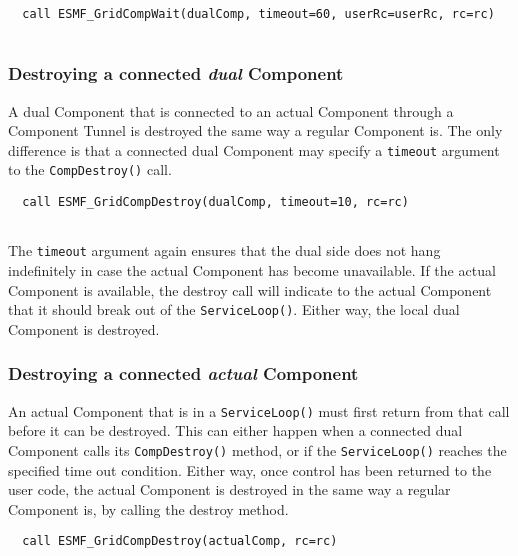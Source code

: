  \begin{verbatim}
  call ESMF_GridCompWait(dualComp, timeout=60, userRc=userRc, rc=rc)
 
\end{verbatim}
 

  \subsubsection{Destroying a connected {\em dual} Component}
   
   \label{sec:CompTunnelDualDestroy}
  
   A dual Component that is connected to an actual Component through a Component
   Tunnel is destroyed the same way a regular Component is. The only
   difference is that a connected dual Component may specify a {\tt timeout}
   argument to the {\tt CompDestroy()} call. 

 \begin{verbatim}
  call ESMF_GridCompDestroy(dualComp, timeout=10, rc=rc)
 
\end{verbatim}
 

   The {\tt timeout} argument again ensures that the dual side does not hang
   indefinitely in case the actual Component has become unavailable. If the
   actual Component is available, the destroy call will indicate to the actual
   Component that it should break out of the {\tt ServiceLoop()}. Either way,
   the local dual Component is destroyed. 

  \subsubsection{Destroying a connected {\em actual} Component}
   
   \label{sec:CompTunnelActualDestroy}
  
   An actual Component that is in a {\tt ServiceLoop()} must first return from 
   that call before it can be destroyed. This can either happen when a connected
   dual Component calls its {\tt CompDestroy()} method, or if the
   {\tt ServiceLoop()} reaches the specified time out condition. Either way,
   once control has been returned to the user code, the actual Component is 
   destroyed in the same way a regular Component is, by calling the destroy
   method. 

 \begin{verbatim}
  call ESMF_GridCompDestroy(actualComp, rc=rc)
 
\end{verbatim}

\setlength{\parskip}{\oldparskip}
\setlength{\parindent}{\oldparindent}
\setlength{\baselineskip}{\oldbaselineskip}
